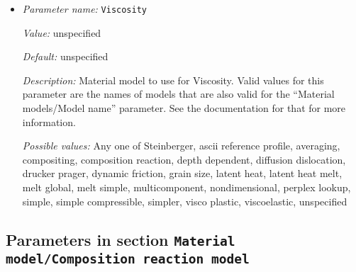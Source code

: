 \begin{itemize}
{\it Value:} unspecified


{\it Default:} unspecified


{\it Description:} Material model to use for Thermal expansion coefficient. Valid values for this parameter are the names of models that are also valid for the ``Material models/Model name'' parameter. See the documentation for that for more information.


{\it Possible values:} Any one of Steinberger, ascii reference profile, averaging, compositing, composition reaction, depth dependent, diffusion dislocation, drucker prager, dynamic friction, grain size, latent heat, latent heat melt, melt global, melt simple, multicomponent, nondimensional, perplex lookup, simple, simple compressible, simpler, visco plastic, viscoelastic, unspecified
\item {\it Parameter name:} {\tt Viscosity}
\label{parameters:Material model/Compositing/Viscosity}


{\it Value:} unspecified


{\it Default:} unspecified


{\it Description:} Material model to use for Viscosity. Valid values for this parameter are the names of models that are also valid for the ``Material models/Model name'' parameter. See the documentation for that for more information.


{\it Possible values:} Any one of Steinberger, ascii reference profile, averaging, compositing, composition reaction, depth dependent, diffusion dislocation, drucker prager, dynamic friction, grain size, latent heat, latent heat melt, melt global, melt simple, multicomponent, nondimensional, perplex lookup, simple, simple compressible, simpler, visco plastic, viscoelastic, unspecified
\end{itemize}

\subsection{Parameters in section \tt Material model/Composition reaction model}
\label{parameters:Material_20model/Composition_20reaction_20model}

